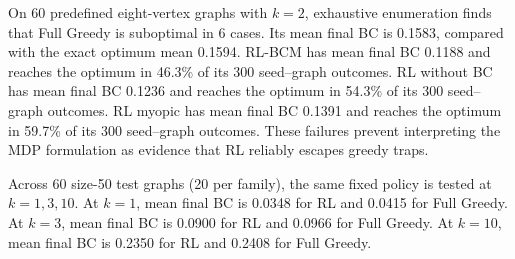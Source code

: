 On 60 predefined eight-vertex graphs with $k=2$, exhaustive enumeration finds that Full Greedy is suboptimal in 6 cases. Its mean final BC is 0.1583, compared with the exact optimum mean 0.1594. RL-BCM has mean final BC 0.1188 and reaches the optimum in 46.3\% of its 300 seed--graph outcomes. RL without BC has mean final BC 0.1236 and reaches the optimum in 54.3\% of its 300 seed--graph outcomes. RL myopic has mean final BC 0.1391 and reaches the optimum in 59.7\% of its 300 seed--graph outcomes. These failures prevent interpreting the MDP formulation as evidence that RL reliably escapes greedy traps.

Across 60 size-50 test graphs (20 per family), the same fixed policy is tested at $k=1,3,10$. At $k=1$, mean final BC is 0.0348 for RL and 0.0415 for Full Greedy. At $k=3$, mean final BC is 0.0900 for RL and 0.0966 for Full Greedy. At $k=10$, mean final BC is 0.2350 for RL and 0.2408 for Full Greedy. 
